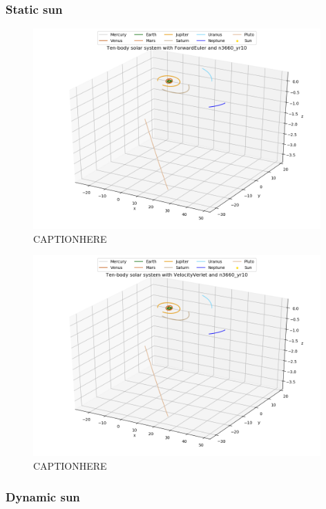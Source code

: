 \documentclass{article}
\begin{document}
\subsubsection{Static sun}

    \begin{figure}[H]
        \centering
        \includegraphics[width = 11cm]{img/plot3D_10body_F_n3660_yr10.png}
        \caption{CAPTIONHERE}
        \label{fig:plot3D_10body_F_n3660_yr10}
    \end{figure}

    \begin{figure}[H]
        \centering
        \includegraphics[width = 11cm]{img/plot3D_10body_V_n3660_yr10.png}
        \caption{CAPTIONHERE}
        \label{fig:plot3D_10body_V_n3660_yr10}
    \end{figure}

\subsubsection{Dynamic sun}
\end{document}
